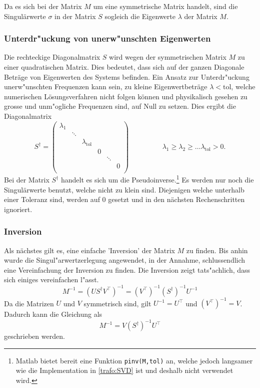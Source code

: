 \begin{refsection}
Da es sich bei der Matrix $M$ um eine symmetrische Matrix handelt, sind die Singulärwerte $\sigma$ in der Matrix $S$ sogleich die Eigenwerte $\lambda$ der Matrix $M$.

\subsubsection{Unterdr"uckung von unerw"unschten Eigenwerten}
Die rechteckige Diagonalmatrix $S$ wird wegen der symmetrischen Matrix $M$ zu einer quadratischen Matrix. Dies bedeutet, dass sich auf der ganzen Diagonale Beträge von Eigenwerten des Systems befinden. Ein Ansatz zur Unterdr"uckung unerw"unschten Frequenzen kann sein, zu kleine Eigenwertbeträge $\lambda < \text{tol}$, welche numerischen Lösungsverfahren nicht folgen können und physikalisch gesehen zu grosse und unm"ogliche Frequenzen sind, auf Null zu setzen. Dies ergibt die Diagonalmatrix 
\begin{equation*}
	S^\dagger = \left( 
			\begin{array}{cccccc}
				\lambda_1 & & & & & \\
				& \ddots & & & &  \\
				& & \lambda_{\text{tol}} & & & \\
				& & & 0 & & \\
				& & & & \ddots & \\
				& & & & & 0 \\				
				\end{array}
			\right) 
			\hspace{2cm}\lambda_1 \geq \lambda_2 \geq \dots \lambda_{\text{tol}} > 0. 
\end{equation*}
Bei der Matrix $S^\dagger$ handelt es sich um die Pseudoinverse.\footnote{Matlab bietet bereit eine Funktion \texttt{pinv(M,tol)} an, welche jedoch langsamer wie die Implementation in \ref{trafo:SVD} ist und deshalb nicht verwendet wird.} Es werden nur noch die Singulärwerte benutzt, welche nicht zu klein sind. Diejenigen welche unterhalb einer Toleranz sind, werden auf $0$ gesetzt und in den nächsten Rechenschritten ignoriert.

\subsubsection{Inversion}
Als nächstes gilt es, eine einfache 'Inversion' der Matrix $M$ zu finden. Bis anhin wurde die Singul"arwertzerlegung angewendet, in der Annahme, schlussendlich eine Vereinfachung der Inversion zu finden. Die Inversion zeigt tats"achlich, dass sich einiges vereinfachen l"asst. \cite{trafo:Watkins}
\begin{equation*}
	M^{-1} = \left(US^\dagger V^\top\right)^{-1} = \left(V^\top\right)^{-1} \left(S^\dagger\right)^{-1} U^{-1}
\end{equation*}
Da die Matrizen $U$ und $V$ symmetrisch sind, gilt $U^{-1} = U^\top$ und $\left(V^\top\right)^{-1} = V$. Dadurch kann die Gleichung als 
\begin{equation*}
	M^{-1} = V \left(S^\dagger \right)^{-1} U^\top
\end{equation*}
geschrieben werden.


\end{refsection}

